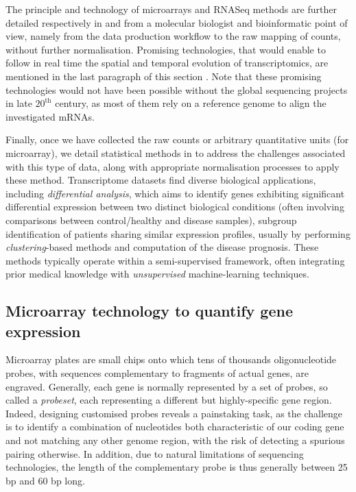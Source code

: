 The principle and technology of microarrays and RNASeq methods are further detailed respectively in  and  from a molecular biologist and \gls{bioinformatic} point of view, namely from the data production workflow to the raw mapping of counts, without further normalisation. Promising technologies, that would enable to follow in real time the spatial and temporal evolution of transcriptomics, are mentioned in the last paragraph of this section . Note that these promising technologies would not have been possible without the global sequencing projects in late $20^\text{th}$ century, as most of them rely on a reference genome to align the investigated mRNAs. 

Finally, once we have collected the raw counts or arbitrary quantitative units (for microarray), we detail statistical methods in  to address the challenges associated with this type of data, along with appropriate normalisation processes to apply these method. Transcriptome datasets find diverse biological applications, including \emph{differential analysis}, which aims to identify genes exhibiting significant differential expression between two distinct biological conditions (often involving comparisons between control/healthy and disease samples),  subgroup identification of patients sharing similar expression profiles, usually by performing \emph{clustering}-based methods and computation of the disease prognosis. These methods typically operate within a semi-supervised framework, often integrating prior medical knowledge with \emph{unsupervised} machine-learning techniques.


 \subsection{Microarray technology to quantify gene expression}
\label{subsec:microarray}
Microarray plates are small chips onto which tens of thousands oligonucleotide probes, with sequences complementary to fragments of actual genes, are engraved. Generally, each gene is normally represented by a set of probes, so called a \emph{probeset}, each representing a different but highly-specific gene region. Indeed, designing customised probes reveals a painstaking task, as the challenge is to identify a combination of nucleotides both characteristic of our coding gene and not matching any other genome region, with the risk of detecting a spurious pairing otherwise. In addition, due to natural limitations of sequencing technologies, the length of the complementary probe is thus generally between 25 bp and 60 bp long.  

